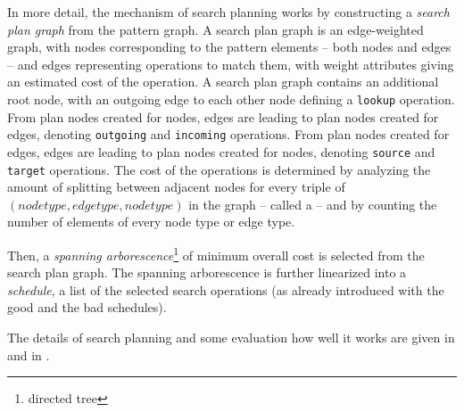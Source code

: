 In more detail, the mechanism of search planning works by constructing a \emph{search plan graph} from the pattern graph.
A search plan graph is an edge-weighted graph, with nodes corresponding to the pattern elements -- both nodes and edges -- and edges representing operations to match them, with weight attributes giving an estimated cost of the operation. 
A search plan graph contains an additional root node, with an outgoing edge to each other node defining a \texttt{lookup} operation. 
From plan nodes created for nodes, edges are leading to plan nodes created for edges, denoting \texttt{outgoing} and \texttt{incoming} operations.
From plan nodes created for edges, edges are leading to plan nodes created for nodes, denoting \texttt{source} and \texttt{target} operations.
The cost of the operations is determined by analyzing the amount of splitting between adjacent nodes for every triple of $(node type, edge type, node type)$ in the graph -- called a  -- and by counting the number of elements of every node type or edge type.

Then, a \emph{spanning arborescence}\footnote{directed tree} of minimum overall cost is selected from the search plan graph. 
The spanning arborescence is further linearized into a \emph{schedule}, a list of the selected search operations  (as already introduced with the good and the bad schedules).

The details of search planning and some evaluation how well it works are given in \cite{Bat:06} and in \cite{BKG:07}.


